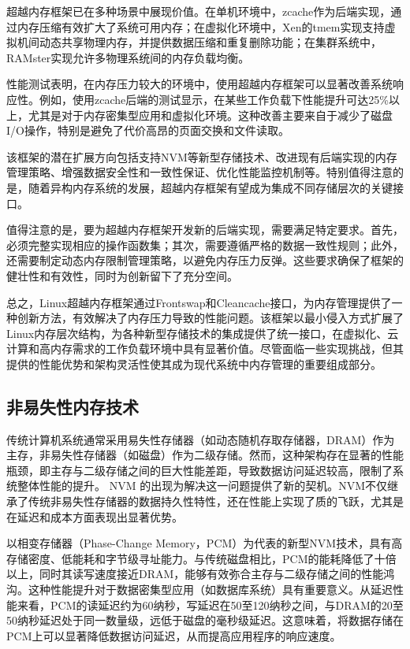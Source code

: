 超越内存框架已在多种场景中展现价值。在单机环境中，zcache作为后端实现，通过内存压缩有效扩大了系统可用内存；在虚拟化环境中，Xen的tmem实现支持虚拟机间动态共享物理内存，并提供数据压缩和重复删除功能；在集群系统中，RAMster实现允许多物理系统间的内存负载均衡。

性能测试表明，在内存压力较大的环境中，使用超越内存框架可以显著改善系统响应性。例如，使用zcache后端的测试显示，在某些工作负载下性能提升可达25\%以上，尤其是对于内存密集型应用和虚拟化环境。这种改善主要来自于减少了磁盘I/O操作，特别是避免了代价高昂的页面交换和文件读取。

该框架的潜在扩展方向包括支持NVM等新型存储技术、改进现有后端实现的内存管理策略、增强数据安全性和一致性保证、优化性能监控机制等。特别值得注意的是，随着异构内存系统的发展，超越内存框架有望成为集成不同存储层次的关键接口。

值得注意的是，要为超越内存框架开发新的后端实现，需要满足特定要求。首先，必须完整实现相应的操作函数集；其次，需要遵循严格的数据一致性规则；此外，还需要制定动态内存限制管理策略，以避免内存压力反弹。这些要求确保了框架的健壮性和有效性，同时为创新留下了充分空间。

总之，Linux超越内存框架通过Frontswap和Cleancache接口，为内存管理提供了一种创新方法，有效解决了内存压力导致的性能问题。该框架以最小侵入方式扩展了Linux内存层次结构，为各种新型存储技术的集成提供了统一接口，在虚拟化、云计算和高内存需求的工作负载环境中具有显著价值。尽管面临一些实现挑战，但其提供的性能优势和架构灵活性使其成为现代系统中内存管理的重要组成部分。

\subsection{非易失性内存技术}

传统计算机系统通常采用易失性存储器（如动态随机存取存储器，DRAM）作为主存，非易失性存储器（如磁盘）作为二级存储。然而，这种架构存在显著的性能瓶颈，即主存与二级存储之间的巨大性能差距，导致数据访问延迟较高，限制了系统整体性能的提升。 NVM 的出现为解决这一问题提供了新的契机。NVM不仅继承了传统非易失性存储器的数据持久性特性，还在性能上实现了质的飞跃，尤其是在延迟和成本方面表现出显著优势。

以相变存储器（Phase-Change Memory，PCM）为代表的新型NVM技术，具有高存储密度、低能耗和字节级寻址能力。与传统磁盘相比，PCM的能耗降低了十倍以上，同时其读写速度接近DRAM，能够有效弥合主存与二级存储之间的性能鸿沟。这种性能提升对于数据密集型应用（如数据库系统）具有重要意义。从延迟性能来看，PCM的读延迟约为60纳秒，写延迟在50至120纳秒之间，与DRAM的20至50纳秒延迟处于同一数量级，远低于磁盘的毫秒级延迟。这意味着，将数据存储在PCM上可以显著降低数据访问延迟，从而提高应用程序的响应速度。

